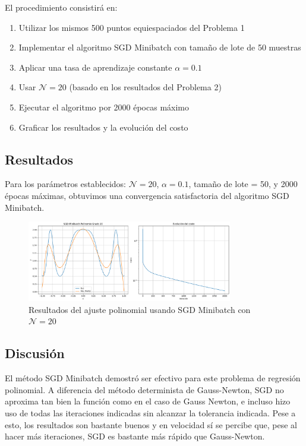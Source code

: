 \documentclass{article}
\begin{document}
El procedimiento consistirá en:
\begin{enumerate}
    \item Utilizar los mismos 500 puntos equiespaciados del Problema 1
    \item Implementar el algoritmo SGD Minibatch con tamaño de lote de 50 muestras
    \item Aplicar una tasa de aprendizaje constante $\alpha = 0.1$
    \item Usar $\mathcal{N} = 20$ (basado en los resultados del Problema 2)
    \item Ejecutar el algoritmo por 2000 épocas máximo
    \item Graficar los resultados y la evolución del costo
\end{enumerate}

\subsection{Resultados}
\setcounter{equation}{0}

Para los parámetros establecidos: $\mathcal{N} = 20$, $\alpha = 0.1$, tamaño de lote = 50, y 2000 épocas máximas, obtuvimos una convergencia satisfactoria del algoritmo SGD Minibatch.

\begin{figure}[H]
    \centering
    \includegraphics[width=0.8\textwidth]{images/3_sgd_minibatch.png}
    \caption{Resultados del ajuste polinomial usando SGD Minibatch con $\mathcal{N}=20$}
    \label{fig:sgd_results}
\end{figure}

\subsection{Discusión}

El método SGD Minibatch demostró ser efectivo para este problema de regresión polinomial. A diferencia del método determinista de Gauss-Newton, SGD no aproxima tan bien la función como en el caso de Gauss Newton, e incluso hizo uso de todas las iteraciones indicadas sin alcanzar la tolerancia indicada. Pese a esto, los resultados son bastante buenos y en velocidad sí se percibe que, pese al hacer más iteraciones, SGD es bastante más rápido que Gauss-Newton.
\end{document}
